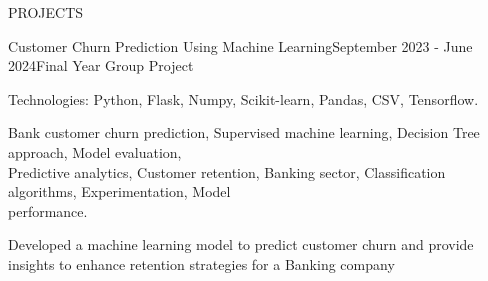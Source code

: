 \documentclass{resume} %
\begin{document}

\begin{rSection}{PROJECTS}

\begin{rSubsection}{Customer Churn Prediction Using Machine Learning}{September 2023 - June 2024}{Final Year Group Project}{} 
\item Technologies: Python, Flask, Numpy, Scikit-learn, Pandas, CSV, Tensorflow.
\item Bank customer churn prediction, Supervised machine learning, Decision Tree approach, Model evaluation, \\Predictive analytics, Customer retention, Banking sector, Classification algorithms, Experimentation, Model \\performance.
\item Developed a machine learning model to predict customer churn and provide insights to enhance retention strategies for a Banking company

\end{rSubsection} 









\end{rSection}
\end{document}
